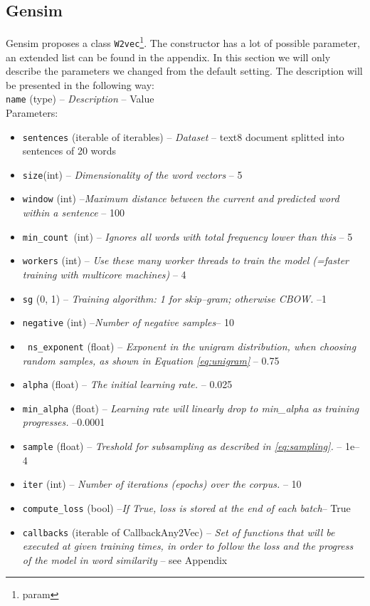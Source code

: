 \subsection{Gensim}
Gensim proposes a class \texttt{W2vec}\footnote{param}. The constructor has a lot of possible parameter, an extended list can be found in the appendix. In this section we will only describe the parameters we changed from the default setting.  The description will be presented in the following way: \\
\texttt{name} (type) -- \textit{Description} -- Value\\
Parameters:
\begin{itemize}
   \item \texttt{sentences} (iterable of iterables) -- \textit{Dataset} -- text8 document splitted into sentences of 20 words 
  \item \texttt{size}(int) – \textit{Dimensionality of the word vectors } -- 5
\item \texttt{window} (int) --\textit {Maximum distance between the current and predicted word within a sentence }-- 100
  \item  \texttt{min\_count }(int) --\textit{ Ignores all words with total frequency lower than this }-- 5
 \item   \texttt{workers} (int) -- \textit{ Use these many worker threads to train the model (=faster training with multicore machines) }-- 4 
\item    \texttt{sg} ({0, 1}) --\textit{ Training algorithm: 1 for skip--gram; otherwise CBOW. }--1
  \item  \texttt{negative} (int) --\textit{Number of negative samples}-- 10 
\item   \texttt{ ns\_exponent} (float) --\textit{ Exponent in the unigram distribution, when choosing random samples, as shown in Equation \ref{eq:unigram} }-- 0.75
\item    \texttt{alpha} (float) --\textit{ The initial learning rate. }-- 0.025
 \item   \texttt{min\_alpha} (float) --\textit{ Learning rate will linearly drop to min\_alpha as training progresses. }--0.0001
 \item   \texttt{sample} (float) --\textit{ Treshold for subsampling as described in \ref{eq:sampling}. } -- 1e--4
  \item  \texttt{iter} (int) --\textit{ Number of iterations (epochs) over the corpus. }-- 10 
 \
  \item  \texttt{compute\_loss} (bool) --\textit{If True, loss is stored at the end of each batch}-- True
 \item   \texttt{callbacks} (iterable of CallbackAny2Vec) --\textit{ Set of functions that will be executed at given training times, in order to follow the loss and the progress of the model in word similarity }-- see Appendix
\end{itemize}

